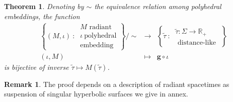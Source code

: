 \documentclass[a4paper,12pt]{article}
\def\RR{\mathbb{R}}
\def\quadform{\mathbf{g}}
\newcommand{\functionn}[4]{\displaystyle\begin{array}{l|rcl}
& \displaystyle #1 & \longrightarrow & \displaystyle #2 \\
	& \displaystyle #3 & \longmapsto & \displaystyle #4 \end{array}}
\newtheorem{theo}{Theorem}	%
\theoremstyle{definition}
\newtheorem*{rem}{Remark}			 %
\begin{document}
					\begin{theo}\label{theo:time_carac}
					Denoting by $\sim$ the equivalence relation among polyhedral embeddings, the function
					 $$ \functionn{ \left\{(M,\iota) ~:~ \begin{array}{c}
					 M \text{ radiant}\\
												 \iota~\text{polyhedral} \\ \text{embedding} 
												 \end{array}
\right\}/\sim }{ \left\{ \widetilde\tau ~:~\begin{array}{c}
												 \widetilde\tau: \Sigma\rightarrow \RR_+ \\ \text{ distance-like }
												 \end{array}\right\} }{(\iota,M)}{\quadform\circ \iota }$$
					is bijective of inverse $\widetilde\tau \mapsto M(\widetilde\tau)$.
					
					\end{theo}
					\begin{rem}
					 The proof depends on a description of radiant spacetimes as suspension of singular hyperbolic surfaces we give in annex.
					\end{rem}
\end{document}
